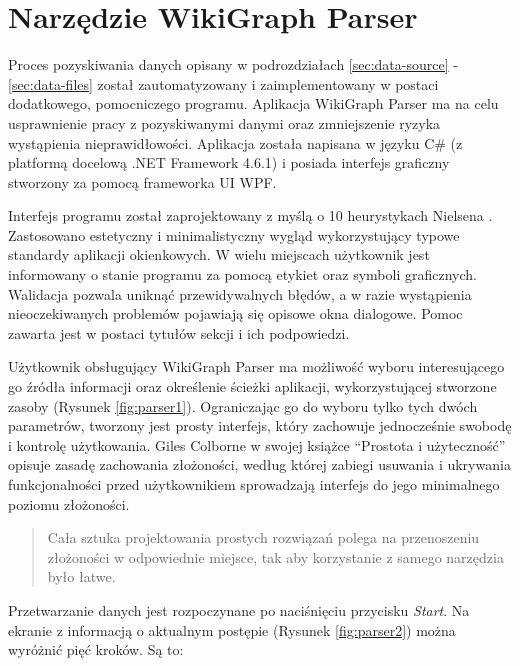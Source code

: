 \section{Narzędzie WikiGraph Parser}
\label{sec:parser-tool}
Proces pozyskiwania danych opisany w podrozdziałach \ref{sec:data-source} - \ref{sec:data-files} został zautomatyzowany i zaimplementowany w postaci dodatkowego, pomocniczego programu. Aplikacja WikiGraph Parser ma na celu usprawnienie pracy z pozyskiwanymi danymi oraz zmniejszenie ryzyka wystąpienia nieprawidłowości. Aplikacja została napisana w języku C\# (z platformą docelową .NET Framework 4.6.1) i posiada interfejs graficzny stworzony za pomocą frameworka UI WPF.

Interfejs programu został zaprojektowany z myślą o 10 heurystykach Nielsena \cite{Heuristics}. Zastosowano estetyczny i minimalistyczny wygląd wykorzystujący typowe standardy aplikacji okienkowych. W wielu miejscach użytkownik jest informowany o stanie programu za pomocą etykiet oraz symboli graficznych. Walidacja pozwala uniknąć przewidywalnych błędów, a w razie wystąpienia nieoczekiwanych problemów pojawiają się opisowe okna dialogowe. Pomoc zawarta jest w postaci tytułów sekcji i ich podpowiedzi.


Użytkownik obsługujący WikiGraph Parser ma możliwość wyboru interesującego go źródła informacji oraz określenie ścieżki aplikacji, wykorzystującej stworzone zasoby (Rysunek \ref{fig:parser1}). Ograniczając go do wyboru tylko tych dwóch parametrów, tworzony jest prosty interfejs, który zachowuje jednocześnie swobodę i kontrolę użytkowania. Giles Colborne w swojej książce ``Prostota i użyteczność'' \cite{ProstotaUzytecznosc} opisuje zasadę zachowania złożoności, według której zabiegi usuwania i ukrywania funkcjonalności przed użytkownikiem sprowadzają interfejs do jego minimalnego poziomu złożoności.

\begin{center}
	\hyphenblockcquote{polish}{ProstotaUzytecznosc}{
        Cała sztuka projektowania prostych rozwiązań polega na przenoszeniu złożoności w odpowiednie miejsce, tak aby korzystanie z samego narzędzia było łatwe.
	}
\end{center}


Przetwarzanie danych jest rozpoczynane po naciśnięciu przycisku \textit{Start}. Na ekranie z informacją o aktualnym postępie (Rysunek \ref{fig:parser2}) można wyróżnić pięć kroków. Są to:

